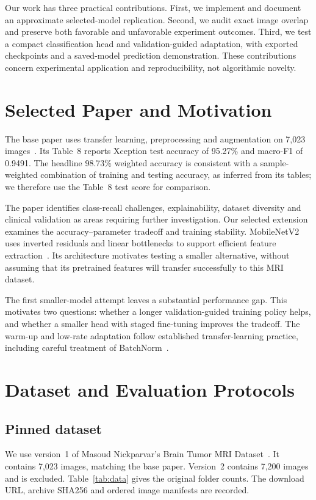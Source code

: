 \documentclass[11pt,a4paper]{article}
\begin{document}
Our work has three practical contributions. First, we implement and document
an approximate selected-model replication. Second, we audit exact image overlap
and preserve both favorable and unfavorable experiment outcomes. Third, we test
a compact classification head and validation-guided adaptation, with exported
checkpoints and a saved-model prediction demonstration. These contributions
concern experimental application and reproducibility, not algorithmic novelty.

\section{Selected Paper and Motivation}
The base paper uses transfer learning, preprocessing and augmentation on 7,023
images~\cite{disci2025}. Its Table~8 reports Xception test accuracy of 95.27\%
and macro-F1 of 0.9491. The headline 98.73\% weighted accuracy is consistent with
a sample-weighted combination of training and testing accuracy, as inferred
from its tables; we therefore use the Table~8 test score for comparison.

The paper identifies class-recall challenges, explainability, dataset diversity
and clinical validation as areas requiring further investigation. Our selected
extension examines the accuracy--parameter tradeoff and training stability.
MobileNetV2 uses inverted residuals and linear bottlenecks to support efficient
feature extraction~\cite{sandler2018}. Its architecture motivates testing a
smaller alternative, without assuming that its pretrained features will transfer
successfully to this MRI dataset.

The first smaller-model attempt leaves a substantial performance gap. This
motivates two questions: whether a longer validation-guided training policy
helps, and whether a smaller head with staged fine-tuning improves the tradeoff.
The warm-up and low-rate adaptation follow established transfer-learning
practice, including careful treatment of BatchNorm~\cite{kerasguide}.

\section{Dataset and Evaluation Protocols}
\subsection{Pinned dataset}
We use version~1 of Masoud Nickparvar's Brain Tumor MRI Dataset~\cite{dataset}.
It contains 7,023 images, matching the base paper. Version~2 contains 7,200
images and is excluded. Table~\ref{tab:data} gives the original folder counts.
The download URL, archive SHA256 and ordered image manifests are recorded.
\end{document}
